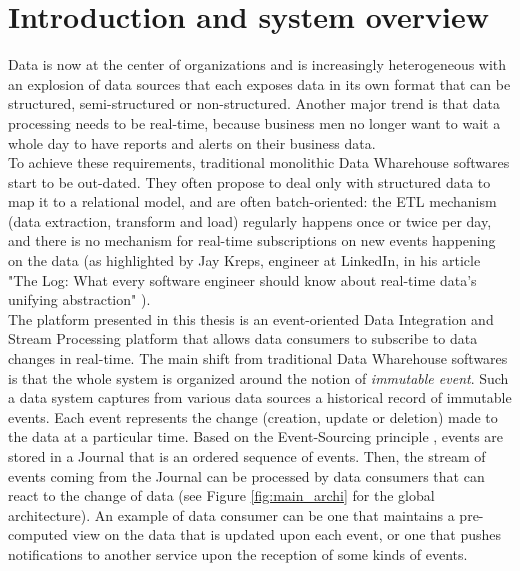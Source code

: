 \chapter{Introduction and system overview}

Data is now at the center of organizations and is increasingly heterogeneous with an explosion of data sources 
that each exposes data in its own format that can be structured, semi-structured or non-structured.
Another major trend is that data processing needs to be real-time, because business men no longer want to wait a whole day 
to have reports and alerts on their business data.
\\

To achieve these requirements, traditional monolithic Data Wharehouse softwares start to be out-dated. They often
propose to deal only with structured data to map it to a relational model, and are often batch-oriented: 
the ETL mechanism (data extraction, transform and load) regularly happens once or twice per day, and there is no mechanism 
for real-time subscriptions on new events happening on the data (as highlighted by Jay Kreps, engineer at LinkedIn, 
in his article "The Log: What every software engineer should know about real-time data's unifying abstraction" ).
\\

The platform presented in this thesis is an event-oriented Data Integration and Stream Processing platform that allows data consumers
to subscribe to data changes in real-time. The main shift from traditional Data Wharehouse softwares is that the whole
system is organized around the notion of \textit{immutable event}. Such a data system captures from various data sources
a historical record of immutable events. Each event represents the change (creation, update or deletion) made to the data at a particular time. 
Based on the Event-Sourcing principle , events are stored in a Journal that is an ordered sequence of 
events. Then, the stream of events coming from the Journal can be processed by data consumers that can react to the change of data (see Figure \ref{fig:main_archi} for the global architecture). 
An example of data consumer can be one that maintains a pre-computed view on the data that is updated upon each event, or one that pushes 
notifications to another service upon the reception of some kinds of events.
\\

